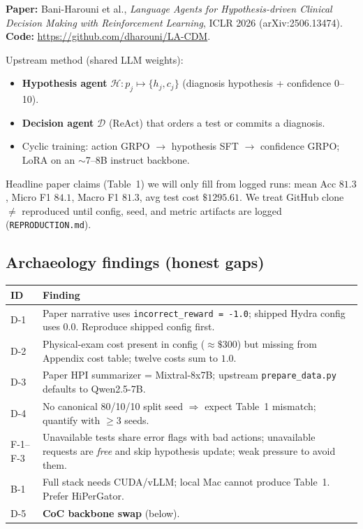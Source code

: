 \documentclass[11pt,letterpaper]{article}
\begin{document}
\textbf{Paper:} Bani-Harouni et al., \emph{Language Agents for Hypothesis-driven Clinical Decision Making with Reinforcement Learning}, ICLR 2026 (arXiv:2506.13474).\\
\textbf{Code:} \url{https://github.com/dharouni/LA-CDM}.

Upstream method (shared LLM weights):
\begin{itemize}
  \item \textbf{Hypothesis agent} \(\mathcal{H}: p_j \mapsto \{h_j,c_j\}\) (diagnosis hypothesis + confidence 0--10).
  \item \textbf{Decision agent} \(\mathcal{D}\) (ReAct) that orders a test or commits a diagnosis.
  \item Cyclic training: action GRPO \(\rightarrow\) hypothesis SFT \(\rightarrow\) confidence GRPO; LoRA on an \(\sim\)7--8B instruct backbone.
\end{itemize}

Headline paper claims (Table~1) we will only fill from logged runs: mean Acc \(81.3\), Micro F1 \(84.1\), Macro F1 \(81.3\), avg test cost \(\$1295.61\). We treat GitHub clone \(\neq\) reproduced until config, seed, and metric artifacts are logged (\texttt{REPRODUCTION.md}).

\subsection{Archaeology findings (honest gaps)}

\begin{center}
\small
\begin{tabular}{@{}lp{}@{}}
\toprule
\textbf{ID} & \textbf{Finding} \\
\midrule
D-1 & Paper narrative uses \texttt{incorrect\_reward = -1.0}; shipped Hydra config uses \(0.0\). Reproduce shipped config first. \\
D-2 & Physical-exam cost present in config (\(\approx\$300\)) but missing from Appendix cost table; twelve costs sum to \(1.0\). \\
D-3 & Paper HPI summarizer = Mixtral-8x7B; upstream \texttt{prepare\_data.py} defaults to Qwen2.5-7B. \\
D-4 & No canonical 80/10/10 split seed \(\Rightarrow\) expect Table~1 mismatch; quantify with \(\ge 3\) seeds. \\
F-1--F-3 & Unavailable tests share error flags with bad actions; unavailable requests are \emph{free} and skip hypothesis update; weak pressure to avoid them. \\
B-1 & Full stack needs CUDA/vLLM; local Mac cannot produce Table~1. Prefer HiPerGator. \\
D-5 & \textbf{CoC backbone swap} (below). \\
\bottomrule
\end{tabular}
\end{center}
\end{document}
